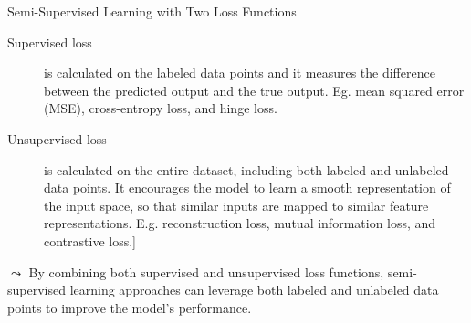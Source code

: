 \documentclass[aspectratio=169]{../latex_main/tntbeamer}  %
\begin{document}
    
    \begin{frame}[c]{Semi-Supervised Learning with Two Loss Functions}

    \begin{description}
        \item[Supervised loss] is calculated on the labeled data points and it measures the difference between the predicted output and the true output. Eg. mean squared error (MSE), cross-entropy loss, and hinge loss.
        \item[Unsupervised loss] is calculated on the entire dataset, including both labeled and unlabeled data points. It encourages the model to learn a smooth representation of the input space, so that similar inputs are mapped to similar feature representations. E.g. reconstruction loss, mutual information loss, and contrastive loss.]
    \end{description}

    \pause
    \medskip

    $\leadsto$ By combining both supervised and unsupervised loss functions, semi-supervised learning approaches can leverage both labeled and unlabeled data points to improve the model's performance.
    
    \end{frame}
\end{document}
